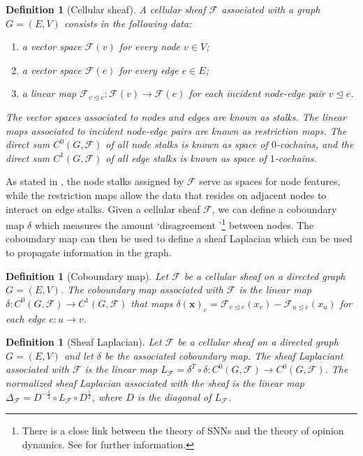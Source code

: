 \documentclass[11pt,a4paper,openright,twoside]{report}
\theoremstyle{plain}
\newtheorem{definition}[proposition]{Definition}
\theoremstyle{definition}
\begin{document}
\begin{definition}[Cellular sheaf]
  A cellular sheaf $\mathcal{F}$ associated with a graph $G = (E,V)$ consists in the following data:
  \begin{enumerate}
    \item a vector space $\mathcal{F}(v)$ for every node $v \in V$;
    \item a vector space $\mathcal{F}(e)$ for every edge $e \in E$;
    \item a linear map $\mathcal{F}_{v \trianglelefteq e}: \mathcal{F}(v) \to \mathcal{F}(e)$ for each incident node-edge pair $v \trianglelefteq e$.
  \end{enumerate}
  The vector spaces associated to nodes and edges are known as stalks. The linear maps associated to incident node-edge pairs are known as restriction maps. The direct sum $C^0(G, \mathcal{F})$ of all node stalks is known as space of $0$-cochains, and the direct sum $C^1(G, \mathcal{F})$ of all edge stalks is known as space of $1$-cochains.
\end{definition}

As stated in \cite{zaghen2024nonlinear}, the  node stalks assigned by $\mathcal{F}$ serve as spaces for node features, while the restriction maps allow the data that resides on adjacent nodes to interact on edge stalks. Given a cellular sheaf $\mathcal{F}$, we can define a coboundary map $\delta$ which measures the amount \lq disagreement \rq\footnote{There is a close link between the theory of SNNs and the theory of opinion dynamics. See \cite{zaghen2024nonlinear} for further information.} between nodes. The coboundary map can then be used to define a sheaf Laplacian which can be used to propagate information in the graph.

\begin{definition}[Coboundary map]
  Let $\mathcal{F}$ be a cellular sheaf on a directed graph $G = (E,V)$. The coboundary map associated with $\mathcal{F}$ is the linear map $\delta: C^0(G, \mathcal{F}) \to C^1(G, \mathcal{F})$ that maps $\delta(\mathbf{x})_{e} = \mathcal{F}_{v \trianglelefteq e}(x_v) - \mathcal{F}_{u \trianglelefteq e}(x_u)$ for each edge $e: u \to v$.
\end{definition}

\begin{definition}[Sheaf Laplacian]
  Let $\mathcal{F}$ be a cellular sheaf on a directed graph $G = (E,V)$ and let $\delta$ be the associated coboundary map. The sheaf Laplaciant associated with $\mathcal{F}$ is the linear map $L_{\mathcal{F}} = \delta^T \circ \delta: C^0(G, \mathcal{F}) \to C^0(G, \mathcal{F})$. The normalized sheaf Laplacian associated with the sheaf is the linear map $\Delta_{\mathcal{F}} = D^{-\frac{1}{2}} \circ L_{\mathcal{F}} \circ D^{\frac{1}{2}}$, where $D$ is the diagonal of $L_{\mathcal{F}}$.
\end{definition}
\end{document}
